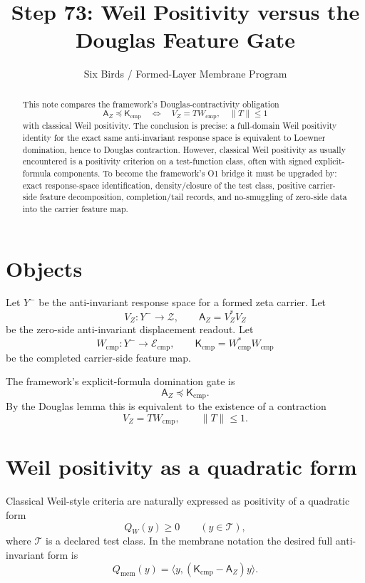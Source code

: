 \documentclass[11pt]{article}
\title{Step 73: Weil Positivity versus the Douglas Feature Gate}
\author{Six Birds / Formed-Layer Membrane Program}
\date{}
\newcommand{\AZ}{\mathsf A_Z}
\newcommand{\Kcmp}{\mathsf K_{\mathrm{cmp}}}
\newcommand{\Yminus}{Y^-}
\begin{document}
\maketitle

\begin{abstract}
This note compares the framework's Douglas-contractivity obligation
\[
        \AZ \preceq \Kcmp
        \quad\Longleftrightarrow\quad
        V_Z=T W_{\mathrm{cmp}},\quad \|T\|\le1
\]
with classical Weil positivity.  The conclusion is precise: a full-domain
Weil positivity identity for the exact same anti-invariant response space is
equivalent to Loewner domination, hence to Douglas contraction.  However,
classical Weil positivity as usually encountered is a positivity criterion on
a test-function class, often with signed explicit-formula components.  To
become the framework's O1 bridge it must be upgraded by: exact response-space
identification, density/closure of the test class, positive carrier-side feature
decomposition, completion/tail records, and no-smuggling of zero-side data into
the carrier feature map.
\end{abstract}

\section{Objects}

Let \(\Yminus\) be the anti-invariant response space for a formed zeta carrier.
Let
\[
        V_Z:\Yminus\to \mathcal Z,
        \qquad
        \AZ=V_Z^*V_Z
\]
be the zero-side anti-invariant displacement readout.  Let
\[
        W_{\mathrm{cmp}}:\Yminus\to \mathcal E_{\mathrm{cmp}},
        \qquad
        \Kcmp=W_{\mathrm{cmp}}^*W_{\mathrm{cmp}}
\]
be the completed carrier-side feature map.

The framework's explicit-formula domination gate is
\[
        \AZ\preceq \Kcmp.
\]
By the Douglas lemma this is equivalent to the existence of a contraction
\[
        V_Z=T W_{\mathrm{cmp}},
        \qquad \|T\|\le1.
\]

\section{Weil positivity as a quadratic form}

Classical Weil-style criteria are naturally expressed as positivity of a
quadratic form
\[
        Q_W(y)\ge0
        \qquad (y\in\mathcal T),
\]
where \(\mathcal T\) is a declared test class.  In the membrane notation the
desired full anti-invariant form is
\[
        Q_{\mathrm{mem}}(y)
        =
        \langle y,(\Kcmp-\AZ)y\rangle.
\]
\end{document}
